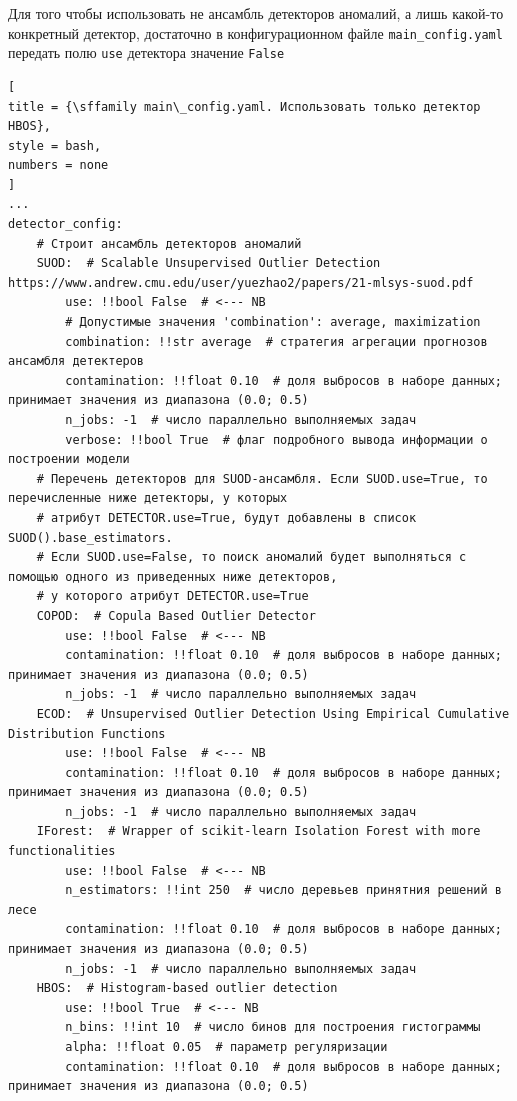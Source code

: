 \documentclass[%
	11pt,
	a4paper,
	utf8,
		]{article}
\begin{document}
Для того чтобы использовать не ансамбль детекторов аномалий, а лишь какой-то конкретный детектор, достаточно в конфигурационном файле \texttt{main\_config.yaml} передать полю \texttt{use} детектора значение \texttt{False}
\begin{lstlisting}[
title = {\sffamily main\_config.yaml. Использовать только детектор HBOS},
style = bash,
numbers = none
]
...
detector_config:
	# Строит ансамбль детекторов аномалий
	SUOD:  # Scalable Unsupervised Outlier Detection https://www.andrew.cmu.edu/user/yuezhao2/papers/21-mlsys-suod.pdf
		use: !!bool False  # <--- NB
		# Допустимые значения 'combination': average, maximization
		combination: !!str average  # стратегия агрегации прогнозов ансамбля детектеров
		contamination: !!float 0.10  # доля выбросов в наборе данных; принимает значения из диапазона (0.0; 0.5)
		n_jobs: -1  # число параллельно выполняемых задач
		verbose: !!bool True  # флаг подробного вывода информации о построении модели
	# Перечень детекторов для SUOD-ансамбля. Если SUOD.use=True, то перечисленные ниже детекторы, у которых
	# атрибут DETECTOR.use=True, будут добавлены в список SUOD().base_estimators.
	# Если SUOD.use=False, то поиск аномалий будет выполняться с помощью одного из приведенных ниже детекторов,
	# у которого атрибут DETECTOR.use=True
	COPOD:  # Copula Based Outlier Detector
		use: !!bool False  # <--- NB
		contamination: !!float 0.10  # доля выбросов в наборе данных; принимает значения из диапазона (0.0; 0.5)
		n_jobs: -1  # число параллельно выполняемых задач
	ECOD:  # Unsupervised Outlier Detection Using Empirical Cumulative Distribution Functions
		use: !!bool False  # <--- NB
		contamination: !!float 0.10  # доля выбросов в наборе данных; принимает значения из диапазона (0.0; 0.5)
		n_jobs: -1  # число параллельно выполняемых задач
	IForest:  # Wrapper of scikit-learn Isolation Forest with more functionalities
		use: !!bool False  # <--- NB
		n_estimators: !!int 250  # число деревьев принятния решений в лесе
		contamination: !!float 0.10  # доля выбросов в наборе данных; принимает значения из диапазона (0.0; 0.5)
		n_jobs: -1  # число параллельно выполняемых задач
	HBOS:  # Histogram-based outlier detection
		use: !!bool True  # <--- NB
		n_bins: !!int 10  # число бинов для построения гистограммы
		alpha: !!float 0.05  # параметр регуляризации
		contamination: !!float 0.10  # доля выбросов в наборе данных; принимает значения из диапазона (0.0; 0.5)
\end{lstlisting}
\end{document}

